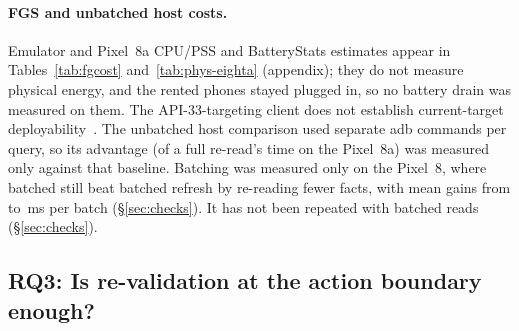 \paragraph{FGS and unbatched host costs.} Emulator and Pixel~8a CPU/PSS and BatteryStats estimates appear in Tables~\ref{tab:fgcost} and~\ref{tab:phys-eighta} (appendix); they do not measure physical energy, and the rented phones stayed plugged in, so no battery drain was measured on them. The API-33-targeting client does not establish current-target deployability~\cite{android_fgstypes,android_fgstimeout}. The unbatched host comparison used separate adb commands per query, so its \stamp advantage (\PhysEightAHostRatio of a full re-read's time on the Pixel~8a) was measured only against that baseline.\ifPhysHost{} Batching was measured only on the Pixel~8, where batched \stamp still beat batched refresh by re-reading fewer facts, with mean gains from \PhysHostStampGainMin to \PhysHostStampGainMax\,ms per batch (\S\ref{sec:checks}).\else{} It has not been repeated with batched reads (\S\ref{sec:checks}).\fi

\subsection{RQ3: Is re-validation at the action boundary enough?}
\label{sec:eval-boundary}




